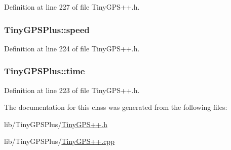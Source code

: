 Definition at line 227 of file Tiny\+G\+P\+S++.\+h.

\subsubsection[{\texorpdfstring{speed}{speed}}]{ Tiny\+G\+P\+S\+Plus\+::speed}\hypertarget{class_tiny_g_p_s_plus_aa085c3e72a399a829dd92af52b373404}{}\label{class_tiny_g_p_s_plus_aa085c3e72a399a829dd92af52b373404}


Definition at line 224 of file Tiny\+G\+P\+S++.\+h.

\subsubsection[{\texorpdfstring{time}{time}}]{ Tiny\+G\+P\+S\+Plus\+::time}\hypertarget{class_tiny_g_p_s_plus_a377c975527fa24b45fb86356505eb134}{}\label{class_tiny_g_p_s_plus_a377c975527fa24b45fb86356505eb134}


Definition at line 223 of file Tiny\+G\+P\+S++.\+h.



The documentation for this class was generated from the following files\+:\begin{DoxyCompactItemize}
\item 
lib/\+Tiny\+G\+P\+S\+Plus/\hyperlink{_tiny_g_p_s_09_09_8h}{Tiny\+G\+P\+S++.\+h}\item 
lib/\+Tiny\+G\+P\+S\+Plus/\hyperlink{_tiny_g_p_s_09_09_8cpp}{Tiny\+G\+P\+S++.\+cpp}\end{DoxyCompactItemize}

